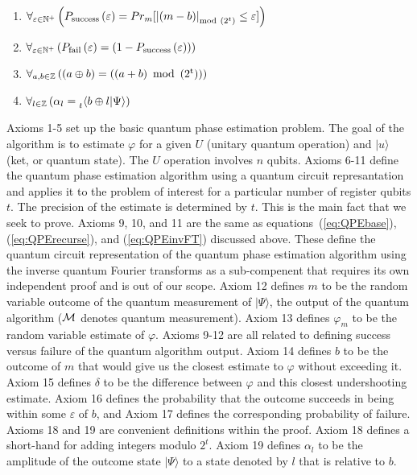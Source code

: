 \documentclass{article}[12pt]
\begin{document}
\begin{enumerate}
\item $\forall_{ \varepsilon  \in \mathbb{N}^+} \left(P_{\rm success}\left( \varepsilon \right) = Pr_{m}[\left|\left(m - b\right)\right|_{{\rm mod}~\left(2^{t}\right)} \leq \varepsilon]\right)$
\item $\forall_{ \varepsilon  \in \mathbb{N}^+} \left(P_{\rm fail}\left( \varepsilon \right) = \left(1 - P_{\rm success}\left( \varepsilon \right)\right)\right)$
\item $\forall_{ a , b  \in \mathbb{Z}} \left(\left(a \oplus b\right) = \left(\left( a + b \right) ~\rm{mod}~ \left(2^{t}\right)\right)\right)$
\item $\forall_{ l  \in \mathbb{Z}} \left(\alpha_{l} = \prescript{}{t}\langle b \oplus l \rvert\Psi \rangle\right)$
\end{enumerate}
Axioms 1-5 set up the basic quantum phase estimation problem.  The goal of the algorithm is to estimate $\varphi$ for a given $U$ (unitary quantum operation) and $\lvert u \rangle$ (ket, or quantum state).  The $U$ operation involves $n$ qubits.  Axioms 6-11 define the quantum phase estimation algorithm using a quantum circuit represantation and applies it to the problem of interest for a particular number of register qubits $t$.  The precision of the estimate is determined by $t$.  This is the main fact that we seek to prove.  Axioms 9, 10, and 11 are the same as equations~(\ref{eq:QPEbase}), (\ref{eq:QPErecurse}), and (\ref{eq:QPEinvFT}) discussed above.  These define the quantum circuit representation of the quantum phase estimation algorithm using the inverse quantum Fourier transforms as a sub-compenent that requires its own independent proof and is out of our scope.
Axiom 12 defines $m$ to be the random variable outcome of the quantum measurement of $\lvert \Psi \rangle$, the output of the quantum algorithm (${\cal M}$ denotes quantum measurement).  Axiom 13 defines $\varphi_m$ to be the random variable estimate of $\varphi$.  Axioms 9-12 are all related to defining success versus failure of the quantum algorithm output.  Axiom 14 defines $b$ to be the outcome of $m$ that would give us the closest estimate to $\varphi$ without exceeding it.  Axiom 15 defines $\delta$ to be the difference between $\varphi$ and this closest undershooting estimate.  Axiom 16 defines the probability that the outcome succeeds in being within some $\varepsilon$ of $b$, and Axiom 17 defines the corresponding probability of failure.  Axioms 18 and 19 are convenient definitions within the proof.  Axiom 18 defines a short-hand for adding integers modulo $2^t$.  Axiom 19 defines $\alpha_l$ to be the amplitude of the outcome state $\vert \Psi \rangle$ to a state denoted by $l$ that is relative to $b$.
\end{document}
